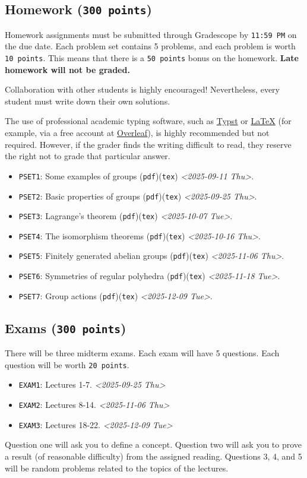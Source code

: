 \documentclass[11pt]{article}
\begin{document}
\subsection*{Homework (\texttt{300 points})}
\label{sec:org35dbb06}
Homework assignments must be submitted through Gradescope by \texttt{11:59 PM} on the
due date. Each problem set contains 5 problems, and each problem is worth \texttt{10
points}. This means that there is a \texttt{50 points} bonus on the homework. \textbf{Late
homework will not be graded.}

Collaboration with other students is highly encouraged! Nevertheless, every
student must write down their own solutions.

The use of professional academic typing software, such as \href{https://typst.app/}{Typst} or
\href{https://www.latex-project.org/}{\LaTeX{}} (for example, via a free account at \href{https://www.overleaf.com}{Overleaf}), is highly recommended
but not required. However, if the grader finds the writing difficult to read,
they reserve the right not to grade that particular answer.


\begin{itemize}
\item \texttt{PSET1}: Some examples of groups (\texttt{pdf})(\texttt{tex}) \textit{<2025-09-11 Thu>}.
\item \texttt{PSET2}: Basic properties of groups (\texttt{pdf})(\texttt{tex}) \textit{<2025-09-25 Thu>}.
\item \texttt{PSET3}: Lagrange's theorem (\texttt{pdf})(\texttt{tex}) \textit{<2025-10-07 Tue>}.
\item \texttt{PSET4}: The isomorphism theorems (\texttt{pdf})(\texttt{tex}) \textit{<2025-10-16 Thu>}.
\item \texttt{PSET5}: Finitely generated abelian groups (\texttt{pdf})(\texttt{tex}) \textit{<2025-11-06 Thu>}.
\item \texttt{PSET6}: Symmetries of regular polyhedra (\texttt{pdf})(\texttt{tex}) \textit{<2025-11-18 Tue>}.
\item \texttt{PSET7}: Group actions (\texttt{pdf})(\texttt{tex}) \textit{<2025-12-09 Tue>}.
\end{itemize}

\subsection*{Exams (\texttt{300 points})}
\label{sec:orgfcb88f2}
There will be three midterm exams. Each exam will have 5 questions. Each question will
be worth \texttt{20 points}.
\begin{itemize}
\item \texttt{EXAM1}: Lectures 1-7. \textit{<2025-09-25 Thu>}
\item \texttt{EXAM2}: Lectures 8-14. \textit{<2025-11-06 Thu>}
\item \texttt{EXAM3}: Lectures 18-22. \textit{<2025-12-09 Tue>}
\end{itemize}
Question one will ask you to define a concept. Question two will ask you to
prove a result (of reasonable difficulty) from the assigned reading. Questions
3, 4, and 5 will be random problems related to the topics of the lectures.
\end{document}
